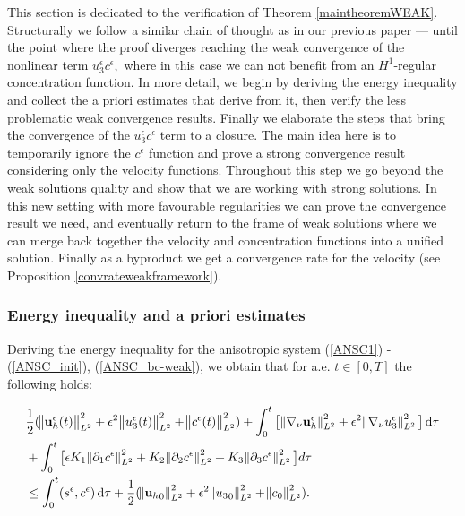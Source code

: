 \documentclass[11pt]{article}
\newcommand*\diff{\mathop{}\!\mathrm{d}}
\begin{document}
This section is dedicated to the verification of Theorem \ref{maintheoremWEAK}. Structurally we follow a similar chain of thought as in our previous paper --- until the point where the proof diverges reaching the weak convergence of the nonlinear term $u_3^\epsilon c^\epsilon,$ where in this case we can not benefit from an $H^1$-regular concentration function. In more detail, we begin by deriving the energy inequality and collect the a priori estimates that derive from it, then verify the less problematic weak convergence results. Finally we elaborate the steps that bring the convergence of the $u_3^\epsilon c^\epsilon$ term to a closure. The main idea here is to temporarily ignore the $c^\epsilon$ function and prove a strong convergence result considering only the velocity functions. Throughout this step we go beyond the weak solutions quality and show that we are working with strong solutions. In this new setting with more favourable regularities we can prove the convergence result we need, and eventually return to the frame of weak solutions where we can merge back together the velocity and concentration functions into a unified solution. Finally as a byproduct we get a convergence rate for the velocity (see Proposition \ref{convrateweakframework}).

\subsubsection{Energy inequality and a priori estimates}

Deriving the energy inequality for the anisotropic system (\ref{ANSC1}) - (\ref{ANSC_init}), (\ref{ANSC_bc-weak}), we obtain that for a.e. $t \in [0,T]$ the following holds:

\begin{equation}
\begin{split}
& \frac{1}{2} (\norm{\mathbf{u}_h^\epsilon (t)}_{L^2}^2 + \epsilon ^ 2 \norm{u_3^\epsilon (t)}_{L^2}^2 + \norm{c^\epsilon (t)}_{L^2}^2) + \int_0 ^ t \big[ \norm{\nabla_\nu \mathbf{u}_h^\epsilon}_{L^2}^2 + \epsilon ^ 2 \norm{\nabla_\nu u_3^\epsilon}_{L^2}^2 \big] \diff \tau \\
& + \int_0 ^ t \big [ \epsilon K_1 \norm{\partial_1 c^\epsilon}_{L^2}^2 + K_2 \norm{\partial_2 c^\epsilon}_{L^2}^2 + K_3 \norm{\partial_3 c^\epsilon}_{L^2}^2 \big ] d \tau \\
& \leq \int_0^t (s^\epsilon,c^\epsilon) \diff \tau + \frac{1}{2} (\norm{{\mathbf{u}_h}_0}_{L^2}^2 + \epsilon ^ 2 \norm{{u_3}_0}_{L^2}^2 + \norm{c_0}_{L^2}^2). \raisetag{50pt} \label{finalformEIEQ}
\end{split}
\end{equation}
\end{document}
